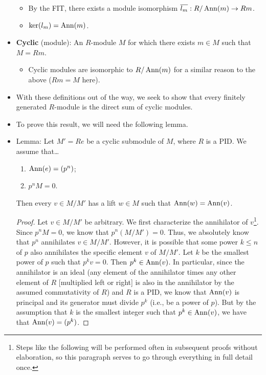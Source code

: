 \documentclass[../notes.tex]{subfiles}
\begin{document}
\begin{itemize}
    \begin{itemize}
        \item By the FIT, there exists a module isomorphism $\overline{l_m}:R/\operatorname{Ann}(m)\to Rm$.
        \item $\ker(l_m)=\operatorname{Ann}(m)$.
    \end{itemize}
    \item \textbf{Cyclic} (module): An $R$-module $M$ for which there exists $m\in M$ such that $M=Rm$.
    \begin{itemize}
        \item Cyclic modules are isomorphic to $R/\operatorname{Ann}(m)$ for a similar reason to the above ($Rm=M$ here).
    \end{itemize}
    \item With these definitions out of the way, we seek to show that every finitely generated $R$-module is the direct sum of cyclic modules.
    \item To prove this result, we will need the following lemma.
    \item Lemma: Let $M'=Re$ be a cyclic submodule of $M$, where $R$ is a PID. We assume that\dots
    \begin{enumerate}[label={(\roman*)}]
        \item $\operatorname{Ann}(e)=(p^n)$;
        \item $p^nM=0$.
    \end{enumerate}
    Then every $v\in M/M'$ has a lift $w\in M$ such that $\operatorname{Ann}(w)=\operatorname{Ann}(v)$.
    \begin{proof}
        Let $v\in M/M'$ be arbitrary. We first characterize the annihilator of $v$\footnote{Steps like the following will be performed often in subsequent proofs without elaboration, so this paragraph serves to go through everything in full detail once.}. Since $p^nM=0$, we know that $p^n(M/M')=0$. Thus, we absolutely know that $p^n$ annihilates $v\in M/M'$. However, it is possible that some power $k\leq n$ of $p$ also annihilates the specific element $v$ of $M/M'$. Let $k$ be the smallest power of $p$ such that $p^kv=0$. Then $p^k\in\operatorname{Ann}(v)$. In particular, since the annihilator is an ideal (any element of the annihilator times any other element of $R$ [multiplied left or right] is also in the annihilator by the assumed commutativity of $R$) and $R$ is a PID, we know that $\operatorname{Ann}(v)$ is principal and its generator must divide $p^k$ (i.e., be a power of $p$). But by the assumption that $k$ is the smallest integer such that $p^k\in\operatorname{Ann}(v)$, we have that $\operatorname{Ann}(v)=(p^k)$.\par

\end{proof}
\end{itemize}
\end{document}
